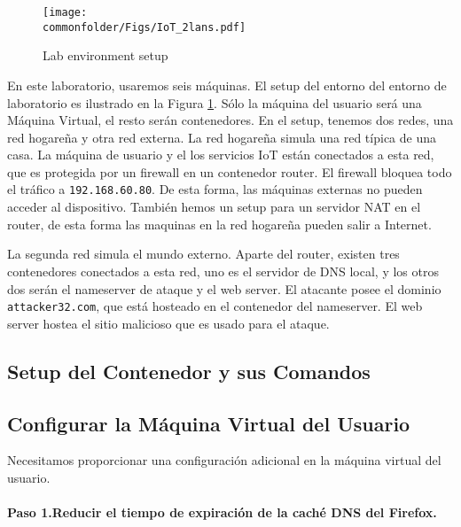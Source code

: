\begin{figure}[htb]
\centering
\texttt{[image: \\commonfolder/Figs/IoT\_2lans.pdf]}
\caption{Lab environment setup}
\label{rebind:fig:labsetup}
\end{figure}

En este laboratorio, usaremos seis máquinas.
El setup del entorno del entorno de laboratorio es ilustrado en la Figura \ref{rebind:fig:labsetup}. Sólo la máquina del usuario será una Máquina Virtual, el resto serán contenedores.
En el setup, tenemos dos redes, una red hogareña y otra red externa. La red hogareña simula una red típica de una casa. La máquina de usuario y el los servicios IoT están conectados a esta red, que es protegida por un firewall en un contenedor router. El firewall bloquea todo el tráfico  a \texttt{192.168.60.80}. De esta forma, las máquinas externas no pueden acceder al dispositivo.
También hemos un setup para un servidor NAT en el router, de esta forma las maquinas en la red hogareña pueden salir a Internet.

La segunda red simula el mundo externo. Aparte del router, existen tres contenedores conectados a esta red, uno es el servidor de DNS local, y los otros dos serán el nameserver de ataque y el web server.
El atacante posee el dominio \texttt{attacker32.com}, que está hosteado en el contenedor del nameserver. El web server hostea el sitio malicioso que es usado para el ataque.


\subsection{Setup del Contenedor y sus Comandos}






\subsection{Configurar la Máquina Virtual del Usuario}

Necesitamos proporcionar una configuración adicional en la máquina virtual del usuario.


\paragraph{Paso 1.Reducir el tiempo de expiración de la caché DNS del Firefox.}

